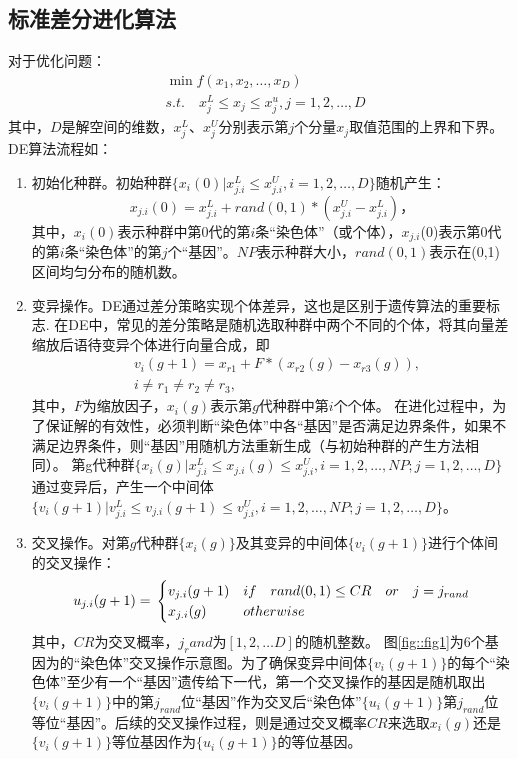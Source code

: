 \documentclass[12pt]{article}
\begin{document}
\subsection{标准差分进化算法}
对于优化问题：
\begin{align*}
&\min f(x_1,x_2,\ldots,x_D)\\
&s.t.\quad x_j^L \leq x_j \leq x_j^u,j=1,2,\ldots,D
\end{align*}
其中，$D$是解空间的维数，$x_j^L$、$x_j^U$分别表示第$j$个分量$x_j$取值范围的上界和下界。DE算法流程如：
\begin{enumerate}
\item 初始化种群。初始种群$\{x_i(0)|x_{j.i}^L \leq x_{j.i}^U, i=1,2,\ldots,D \}$随机产生：
$$x_{j.i}(0)=x_{j.i}^L+rand(0,1)*(x_{j.i}^U-x_{j.i}^L)，$$
其中，$x_i(0)$表示种群中第0代的第$i$条“染色体”（或个体），$x_{j.i}$(0)表示第0代的第$i$条“染色体”的第$j$个“基因”。$NP$表示种群大小，$rand(0,1)$表示在(0,1)区间均匀分布的随机数。
\item 变异操作。DE通过差分策略实现个体差异，这也是区别于遗传算法的重要标志.
在DE中，常见的差分策略是随机选取种群中两个不同的个体，将其向量差缩放后语待变异个体进行向量合成，即
\begin{align*}
&v_i(g+1)=x_{r1}+F*(x_{r2}(g)-x_{r3}(g)),\\
&i \neq r_1 \neq r_2 \neq r_3,
\end{align*}
其中，$F$为缩放因子，$x_i(g)$表示第$g$代种群中第$i$个个体。
在进化过程中，为了保证解的有效性，必须判断“染色体”中各“基因”是否满足边界条件，如果不满足边界条件，则“基因”用随机方法重新生成（与初始种群的产生方法相同）。
第g代种群$\{ x_i(g)|x_{j.i}^L \leq  x_{j.i}(g) \leq x_{j.i}^U, i=1,2,\ldots,NP;j=1,2,\ldots,D \}$通过变异后，产生一个中间体$\{ v_i(g+1)|v_{j.i}^L \leq  v_{j.i}(g+1) \leq v_{j.i}^U, i=1,2,\ldots,NP;j=1,2,\ldots,D \}$。
\item 交叉操作。对第$g$代种群$\{ x_i(g) \}$及其变异的中间体$\{ v_i(g+1) \}$进行个体间的交叉操作：
$$u_{j.i}(g+1)=\\
\begin{cases}
v_{j.i}(g+1) & if \quad rand(0,1) \leq CR \quad or \quad j=j_{rand}  \\
x_{j.i}(g) & otherwise
\end{cases} $$
其中，$CR$为交叉概率，$j_rand$为$[1,2,…D]$的随机整数。
图\ref{fig::fig1}为6个基因为的“染色体”交叉操作示意图。为了确保变异中间体$\{ v_i(g+1) \}$的每个“染色体”至少有一个“基因”遗传给下一代，第一个交叉操作的基因是随机取出$\{ v_i(g+1) \}$中的第$j_{rand}$位“基因”作为交叉后“染色体”$\{ u_i(g+1) \}$第$j_{rand}$位等位“基因”。后续的交叉操作过程，则是通过交叉概率$CR$来选取$x_i(g)$还是$\{ v_i(g+1) \}$等位基因作为$\{ u_i(g+1) \}$的等位基因。

\end{enumerate}
\end{document}

